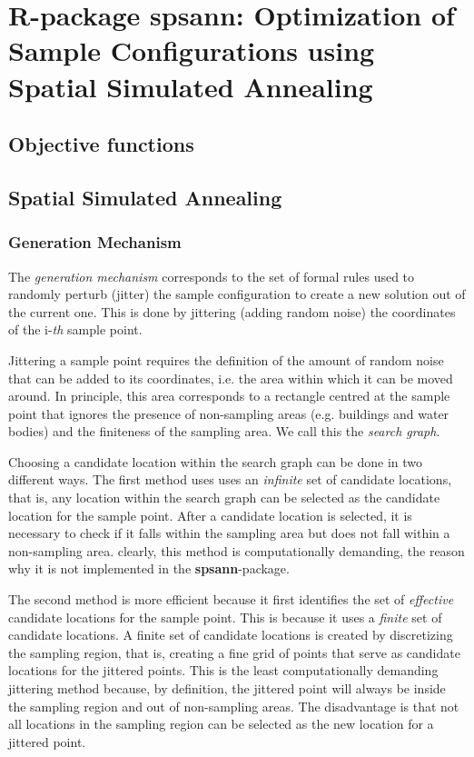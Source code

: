 \artigofalse
\chapter{R-package spsann: Optimization of Sample Configurations using Spatial Simulated Annealing}
\label{apen:spsann}

% 

\section{Objective functions}



\section{Spatial Simulated Annealing}

\subsection{Generation Mechanism}

The \textit{generation mechanism} corresponds to the set of formal rules used 
to randomly perturb (jitter) the sample conﬁguration to create a new solution 
out of the current one. This is done by jittering (adding random noise) the 
coordinates of the i-\textit{th} sample point.

Jittering a sample point requires the definition of the amount of random noise
that can be added to its coordinates, i.e. the area within which it can be 
moved around. In principle, this area corresponds to a rectangle centred at the 
sample point that ignores the presence of non-sampling areas (e.g. buildings 
and water bodies) and the finiteness of the sampling area. We call this the 
\textit{search graph}.

Choosing a candidate location within the search graph can be done in two 
different ways. The first method uses uses an \textit{infinite} set of candidate 
locations, that is, any location within the search graph can be selected as the 
candidate location for the sample point. After a candidate location is selected, 
it is necessary to check if it falls within the sampling area but does not fall
within a non-sampling area. clearly, this method is computationally demanding,
the reason why it is not implemented in the \textbf{spsann}-package.

The second method is more efficient because it first identifies the set of 
\textit{effective} candidate locations for the sample point. This is because it
uses a \textit{finite} set of candidate locations. A finite set of candidate 
locations is created by discretizing the sampling region, that is, creating a 
fine grid of points that serve as candidate locations for the jittered points. 
This is the least computationally demanding jittering method because, by 
definition, the jittered point will always be inside the sampling region and out 
of non-sampling areas. The disadvantage is that not all locations in the 
sampling region can be selected as the new location for a jittered point.


